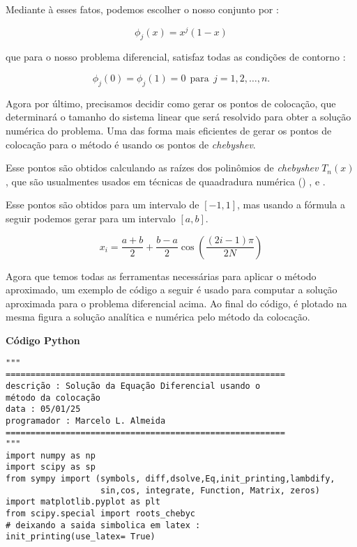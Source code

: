 \documentclass[a4paper, 12pt]{article}
\numberwithin{equation}{section}
\begin{document}
Mediante à esses fatos, podemos escolher o nosso conjunto por : 

\begin{equation*}
    \phi_j(x) = x^{j}(1 - x)
\end{equation*}

que para o nosso problema diferencial, satisfaz todas as condições de contorno : 

\begin{equation*}
    \phi_j(0) =  \phi_j(1) = 0 \ \ \textrm{para} \ \ j = 1,2,\ldots,n.    
\end{equation*}




Agora por último, precisamos decidir como gerar os pontos de colocação, que determinará o tamanho do sistema linear que será resolvido para obter a solução numérica do problema. Uma das forma mais eficientes de gerar os pontos de colocação para o método é usando os pontos de \textit{chebyshev}. 

Esse pontos são obtidos calculando as raízes dos polinômios de \textit{chebyshev} $T_n(x)$, que são usualmentes usados em técnicas de quaadradura numérica (\citep{press2007numerical}) , \citep{chapra2011numerical} e \citep{nakamura1990applied}. 

Esse pontos são obtidos para um intervalo de $[-1,1]$, mas usando a fórmula a seguir podemos gerar para um intervalo $[a,b]$. 

\begin{equation}
    x_i = \dfrac{a + b}{2 } + \dfrac{b - a}{2}\cos\left(\dfrac{\left(2i - 1\right)\pi}{2N}\right)
\end{equation}
 
Agora que temos todas as ferramentas necessárias para aplicar o método aproximado, um exemplo de código a seguir é usado para computar a solução aproximada para o problema diferencial acima. Ao final do código, é plotado na mesma figura a solução analítica e numérica pelo método da colocação. 



\vspace{0.5cm}

{\textbf{\large Código Python}}



\begin{lstlisting}
"""
========================================================
descrição : Solução da Equação Diferencial usando o 
método da colocação
data : 05/01/25
programador : Marcelo L. Almeida 
========================================================
"""
import numpy as np 
import scipy as sp 
from sympy import (symbols, diff,dsolve,Eq,init_printing,lambdify,
                   sin,cos, integrate, Function, Matrix, zeros)
import matplotlib.pyplot as plt 
from scipy.special import roots_chebyc
# deixando a saida simbolica em latex : 
init_printing(use_latex= True)
\end{lstlisting}
\end{document}
